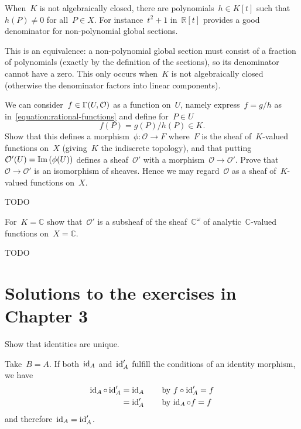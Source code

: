 \documentclass[a4paper,11pt,oneside,openany,article]{memoir}
\begin{document}
\begin{enumerate}
    \begin{solution}
      When~$K$ is not algebraically closed, there are polynomials~$h\in K[t]$ such that~$h(P)\neq 0$ for all~$P\in X$. For instance~$t^2+1$ in~$\mathbb{R}[t]$ provides a good denominator for non-polynomial global sections.

      This is an equivalence: a non-polynomial global section must consist of a fraction of polynomials (exactly by the definition of the sections), so its denominator cannot have a zero. This only occurs when~$K$ is not algebraically closed (otherwise the denominator factors into linear components).
    \end{solution}

    We can consider~$f\in\mathrm{\Gamma}(U,\mathcal{O})$ as a function on~$U$, namely express~$f=g/h$ as in~\eqref{equation:rational-functions} and define for~$P\in U$
    \begin{equation}
      f(P)=g(P)/h(P)\in K.
    \end{equation}
    Show that this defines a morphism~$\phi\colon\mathcal{O}\to F$ where~$F$ is the sheaf of~$K$\nobreakdash-valued functions on~$X$ (giving~$K$ the indiscrete topology), and that putting~$\mathcal{O}'(U)=\operatorname{Im}\left( \phi(U) \right)$ defines a sheaf~$\mathcal{O}'$ with a morphism~$\mathcal{O}\to\mathcal{O}'$. Prove that~$\mathcal{O}\to\mathcal{O}'$ is an isomorphism of sheaves. Hence we may regard~$\mathcal{O}$ as a sheaf of~$K$\nobreakdash-valued functions on~$X$.

    \begin{solution}
      TODO
    \end{solution}

    For~$K=\mathbb{C}$ show that~$\mathcal{O}'$ is a subsheaf of the sheaf~$\mathbb{C}^\omega$ of analytic~$\mathbb{C}$\nobreakdash-valued functions on~$X=\mathbb{C}$.

    \begin{solution}
      TODO
    \end{solution}
\end{enumerate}

\clearpage

\chapter{Solutions to the exercises in Chapter 3}

\begin{exercise}[1.3]
  Show that identities are unique.

  \begin{solution}
    Take~$B=A$. If both~$\operatorname{id}_A$ and~$\operatorname{id}'_A$ fulfill the conditions of an identity morphism, we have
    \begin{align}
      \operatorname{id}_A\circ\operatorname{id}'_A&=\operatorname{id}_A \qquad\text{by $f\circ\operatorname{id}'_A=f$} \\
      &=\operatorname{id}'_A \qquad\text{by $\operatorname{id}_A\circ f=f$}
    \end{align}
    and therefore~$\operatorname{id}_A=\operatorname{id}'_A$.
  \end{solution}
\end{exercise}
\end{document}

